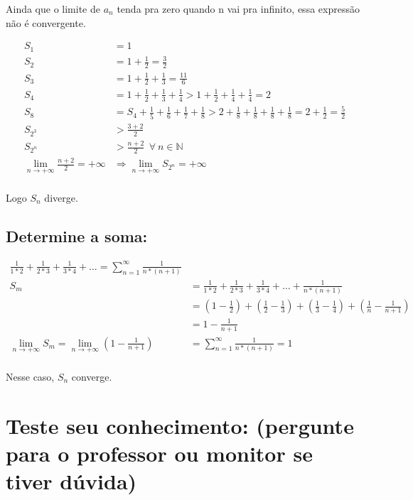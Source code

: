 \documentclass[12pt,openany]{book}
\begin{document}
Ainda que o limite de $a_n$ tenda pra zero quando n vai pra infinito, essa expressão não é convergente.

\begin{align*}
S_1 &= 1 \\
S_2 &= 1 + \frac{1}{2} = \frac{3}{2} \\
S_3 &= 1 + \frac{1}{2} + \frac{1}{3} = \frac{11}{6} \\
S_4 &= 1 + \frac{1}{2} + \frac{1}{3} + \frac{1}{4} > 1 + \frac{1}{2} + \frac{1}{4} + \frac{1}{4} = 2 \\
S_8 &= S_4 + \frac{1}{5} + \frac{1}{6} + \frac{1}{7} + \frac{1}{8} > 2 + \frac{1}{8} + \frac{1}{8} + \frac{1}{8} + \frac{1}{8} = 2 + \frac{1}{2} = \frac{5}{2} \\
S_{2^3} &> \frac{3 + 2}{2} \\
S_{2^n} &> \frac{n + 2}{2} \ \ \forall \ n \in \mathds{N} \\
\lim_{n \rightarrow +\infty} \frac{n+2}{2} = +\infty &\Rightarrow \lim_{n \rightarrow +\infty} S_{2^n} = +\infty \\
\end{align*}

Logo $S_n$ diverge.

\subsection*{Determine a soma:}
\begin{align*}
\frac{1}{1*2} + \frac{1}{2*3} + \frac{1}{3*4} + \hdots = \sum_{n = 1}^{\infty} \frac{1}{n*(n+1)} \\
S_m &= \frac{1}{1*2} + \frac{1}{2*3} + \frac{1}{3*4} + \hdots + \frac{1}{n*(n+1)}\\
 &= \left(1 - \frac{1}{2}\right) + \left(\frac{1}{2} - \frac{1}{3}\right) + \left(\frac{1}{3} - \frac{1}{4}\right) + \left(\frac{1}{n} - \frac{1}{n+1}\right) \\
 &= 1 - \frac{1}{n+1} \\
 \lim_{n \rightarrow +\infty} S_m = \lim_{n \rightarrow +\infty} \left(1 - \frac{1}{n+1} \right) &=  \sum_{n = 1}^{\infty} \frac{1}{n*(n+1)} = 1 \\
\end{align*}

Nesse caso, $S_n$ converge.

\section{Teste seu conhecimento: (pergunte para o professor ou monitor se tiver dúvida)}
\label{sec:s28}
\end{document}
